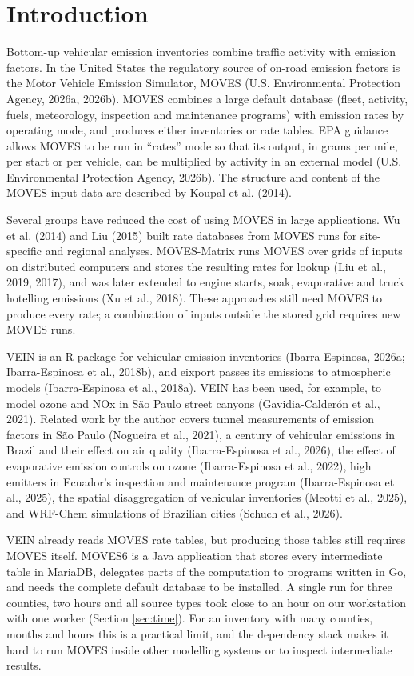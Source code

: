 \documentclass[preprint,
3p]{elsarticle} %
\begin{document}
\section{Introduction}\label{introduction}

Bottom-up vehicular emission inventories combine traffic activity with
emission factors. In the United States the regulatory source of on-road
emission factors is the Motor Vehicle Emission Simulator, MOVES (U.S.
Environmental Protection Agency, 2026a, 2026b). MOVES combines a large
default database (fleet, activity, fuels, meteorology, inspection and
maintenance programs) with emission rates by operating mode, and
produces either inventories or rate tables. EPA guidance allows MOVES to
be run in ``rates'' mode so that its output, in grams per mile, per
start or per vehicle, can be multiplied by activity in an external model
(U.S. Environmental Protection Agency, 2026b). The structure and content
of the MOVES input data are described by Koupal et al. (2014).

Several groups have reduced the cost of using MOVES in large
applications. Wu et al. (2014) and Liu (2015) built rate databases from
MOVES runs for site-specific and regional analyses. MOVES-Matrix runs
MOVES over grids of inputs on distributed computers and stores the
resulting rates for lookup (Liu et al., 2019, 2017), and was later
extended to engine starts, soak, evaporative and truck hotelling
emissions (Xu et al., 2018). These approaches still need MOVES to
produce every rate; a combination of inputs outside the stored grid
requires new MOVES runs.

VEIN is an R package for vehicular emission inventories
(Ibarra-Espinosa, 2026a; Ibarra-Espinosa et al., 2018b), and eixport
passes its emissions to atmospheric models (Ibarra-Espinosa et al.,
2018a). VEIN has been used, for example, to model ozone and NOx in São
Paulo street canyons (Gavidia-Calderón et al., 2021). Related work by
the author covers tunnel measurements of emission factors in São Paulo
(Nogueira et al., 2021), a century of vehicular emissions in Brazil and
their effect on air quality (Ibarra-Espinosa et al., 2026), the effect
of evaporative emission controls on ozone (Ibarra-Espinosa et al.,
2022), high emitters in Ecuador's inspection and maintenance program
(Ibarra-Espinosa et al., 2025), the spatial disaggregation of vehicular
inventories (Meotti et al., 2025), and WRF-Chem simulations of Brazilian
cities (Schuch et al., 2026).

VEIN already reads MOVES rate tables, but producing those tables still
requires MOVES itself. MOVES6 is a Java application that stores every
intermediate table in MariaDB, delegates parts of the computation to
programs written in Go, and needs the complete default database to be
installed. A single run for three counties, two hours and all source
types took close to an hour on our workstation with one worker (Section
\ref{sec:time}). For an inventory with many counties, months and hours
this is a practical limit, and the dependency stack makes it hard to run
MOVES inside other modelling systems or to inspect intermediate results.
\end{document}

